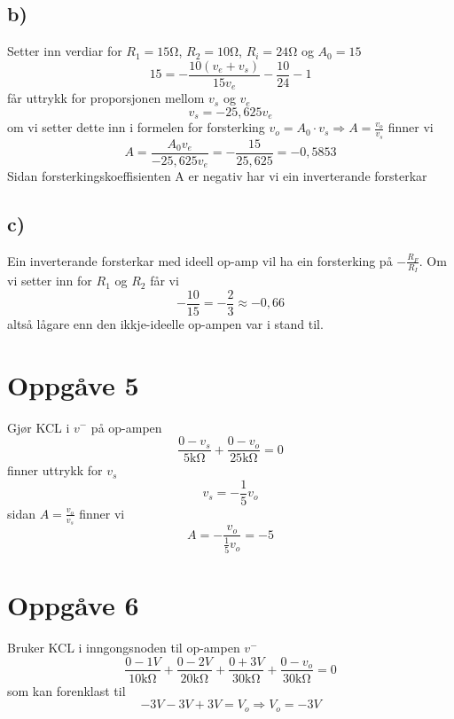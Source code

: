 \documentclass[12pt,a4paper]{article}
\begin{document}
    \subsection{b)}
      Setter inn verdiar for $R_1 = 15\si{\ohm}$, $R_2 = 10\si{\ohm}$, $R_i = 24\si{\ohm}$
      og $A_0 = 15$
      \begin{equation}
        15 = -\frac{10(v_e+v_s)}{15v_e} - \frac{10}{24} - 1
      \end{equation}
      får uttrykk for proporsjonen mellom $v_s$ og $v_e$
      \begin{equation}
        v_s = -25,625v_e
      \end{equation}
      om vi setter dette inn i formelen for forsterking $v_o = A_0 \cdot v_s 
      \Rightarrow A = \frac{v_o}{v_s}$ finner vi
      \begin{equation}
        A = \frac{A_0v_e}{-25,625v_e} = -\frac{15}{25,625} = -0,5853
      \end{equation}
      Sidan forsterkingskoeffisienten A er negativ har vi ein inverterande forsterkar

    \subsection{c)}
      Ein inverterande forsterkar med ideell op-amp vil ha ein forsterking på
      $-\frac{R_F}{R_I}$. Om vi setter inn for $R_1$ og $R_2$ får vi
      \begin{equation}
        -\frac{10}{15} = -\frac{2}{3} \approx -0,66
      \end{equation}
      altså lågare enn den ikkje-ideelle op-ampen var i stand til.


  \section{Oppgåve 5}
    Gjør KCL i $v^-$ på op-ampen
    \begin{equation}
      \frac{0-v_s}{5\si{\kilo\ohm}} + \frac{0-v_o}{25\si{\kilo\ohm}} = 0
    \end{equation}
    finner uttrykk for $v_s$
    \begin{equation}
      v_s = -\frac{1}{5}v_o
    \end{equation}
    sidan $A = \frac{v_o}{v_s}$ finner vi
    \begin{equation}
      A = -\frac{v_o}{\frac{1}{5}v_o} = -5
    \end{equation}

  \section{Oppgåve 6}
    Bruker KCL i inngongsnoden til op-ampen $v^-$
    \begin{equation}
      \frac{0-1V}{10\si{\kilo\ohm}} + \frac{0-2V}{20\si{\kilo\ohm}} +
      \frac{0+3V}{30\si{\kilo\ohm}} + \frac{0-v_o}{30\si{\kilo\ohm}} = 0
    \end{equation}
    som kan forenklast til
    \begin{equation}
      -3V - 3V + 3V = V_o \Rightarrow V_o = -3V
    \end{equation}
\end{document}
